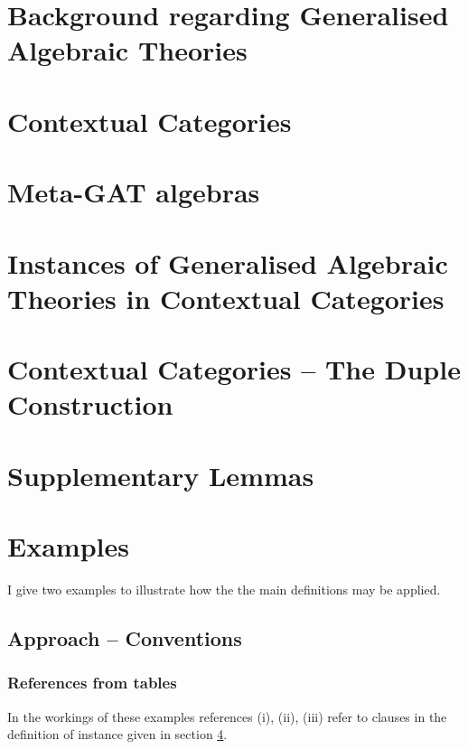 \documentclass[10pt,a4paper]{article}
\theoremstyle{remark}
\begin{document}
\section{Background regarding Generalised Algebraic Theories}

\section{Contextual Categories }

\section{Meta-GAT algebras}

\fi                         %

\section{Instances of Generalised Algebraic Theories in Contextual Categories}
\label{sectioninwhichinstanceisdefined}


\iffalse

\section{Contextual Categories -- The Duple Construction}
\label{contextualnotationparttwo}


\section{Supplementary Lemmas}

\section{Examples}
\label{examples}
I give two examples to illustrate how the the main definitions may be applied. 
\subsection{Approach -- Conventions}


\subsubsection{References from tables}

In the workings of these examples references (i), (ii), (iii)  refer to clauses in the  definition of instance given in 
section \ref{sectioninwhichinstanceisdefined}.
\end{document}

